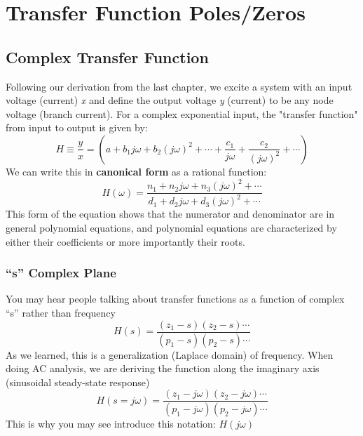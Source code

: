 \section{Transfer Function Poles/Zeros}
\subsection{Complex Transfer Function}
Following our derivation from the last chapter, we excite a system with an input voltage (current) \textit{x} and define the output voltage \textit{y} (current) to be any node voltage (branch current).  For a complex exponential input, the "transfer function" from input to output is given by:
    \begin{equation}
        H \equiv \frac{y}{x} = \left( {a + {b_1}j\omega  + {b_2}{{(j\omega )}^2} +  \cdots  + \frac{{{c_1}}}{{j\omega }} + \frac{{{c_2}}}{{{{(j\omega )}^2}}} +  \cdots } \right)
    \end{equation}
 We can write this in \textbf{canonical form} as a rational function:
    \begin{equation}
        H(\omega ) = \frac{{{n_1} + {n_2}j\omega  + {n_3}{{(j\omega )}^2} +  \cdots }}{{{d_1} + {d_2}j\omega  + {d_3}{{(j\omega )}^2} +  \cdots }}
    \end{equation}
This form of the equation shows that the numerator and denominator are in general polynomial equations, and polynomial equations are characterized by either their coefficients or more importantly their roots.
\subsubsection{“s” Complex Plane}
You may hear people talking about transfer functions as a function of complex “s” rather than frequency
\begin{equation}
	H(s) = \frac{{({z_1} - s)({z_2} - s) \cdots }}{{({p_1} - s)({p_2} - s) \cdots }}
\end{equation}
As we learned, this is a generalization (Laplace domain) of frequency. When doing AC analysis, we are deriving the function along the imaginary axis (sinusoidal steady-state response)
\begin{equation}
	H(s = j\omega ) = \frac{{({z_1} - j\omega )({z_2} - j\omega ) \cdots }}{{({p_1} - j\omega )({p_2} - j\omega ) \cdots }}
\end{equation}
This is why you may see introduce this notation:  $H(j\omega )$
